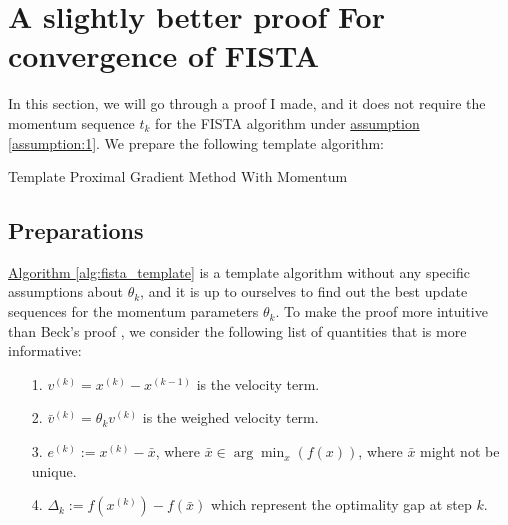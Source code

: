 \documentclass[]{article}
\theoremstyle{definition}
\begin{document}
\appendix

\section{A slightly better proof For convergence of FISTA}\label{sec:fista1_proof}
    In this section, we will go through a proof I made, and it does not require the momentum sequence $t_k$ for the FISTA algorithm under \hyperref[assumption:1]{assumption \ref*{assumption:1}}. We prepare the following template algorithm: 
    \begin{algorithm}
        \begin{algorithmic}[1]
            \ENDFOR
        \end{algorithmic}
        \caption{Template Proximal Gradient Method With Momentum}\label{alg:fista_template}
    \end{algorithm}
    \subsection{Preparations}
        \hyperref[alg:fista_template]{Algorithm \ref*{alg:fista_template}} is a template algorithm without any specific assumptions about $\theta_k$, and it is up to ourselves to find out the best update sequences for the momentum parameters $\theta_k$. To make the proof more intuitive than Beck's proof \cite{paper:FISTA}, we consider the following list of quantities that is more informative: 
        \begin{itemize}
            \item [1.] $v^{(k)} = x^{(k)} - x^{(k -1)}$ is the velocity term. 
            \item [2.] $\bar v^{(k)}= \theta_k v^{(k)}$ is the weighed velocity term. 
            \item [3.] $e^{(k)} := x^{(k)} - \bar x$, where $\bar x \in \arg\min_{x}(f(x))$, where $\bar x$ might not be unique. 
            \item [4.] $\Delta_k := f(x^{(k)}) - f(\bar x)$ which represent the optimality gap at step $k$. 
        \end{itemize}
\end{document}
